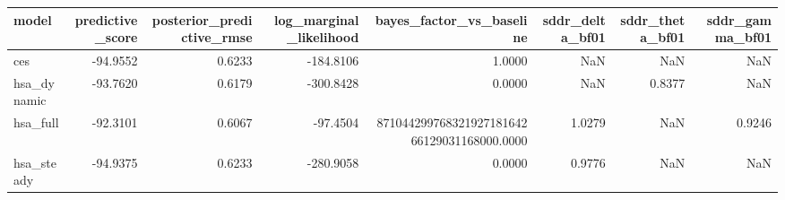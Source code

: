\begin{tabular}{lrrrrrrr}
\toprule
model & predictive\_score & posterior\_predictive\_rmse & log\_marginal\_likelihood & bayes\_factor\_vs\_baseline & sddr\_delta\_bf01 & sddr\_theta\_bf01 & sddr\_gamma\_bf01 \\
\midrule
ces & -94.9552 & 0.6233 & -184.8106 & 1.0000 & NaN & NaN & NaN \\
hsa\_dynamic & -93.7620 & 0.6179 & -300.8428 & 0.0000 & NaN & 0.8377 & NaN \\
hsa\_full & -92.3101 & 0.6067 & -97.4504 & 87104429976832192718164266129031168000.0000 & 1.0279 & NaN & 0.9246 \\
hsa\_steady & -94.9375 & 0.6233 & -280.9058 & 0.0000 & 0.9776 & NaN & NaN \\
\bottomrule
\end{tabular}
